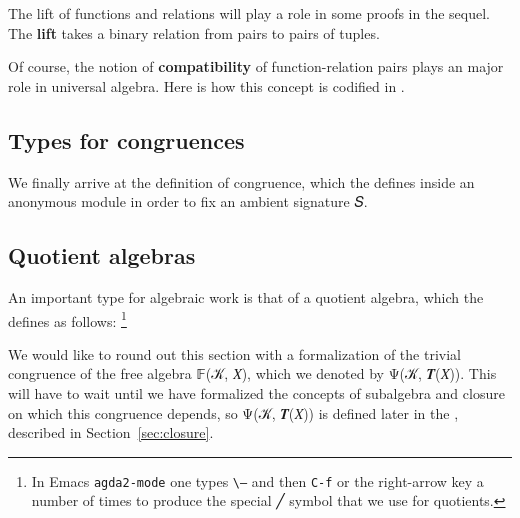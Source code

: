 \documentclass[a4paper,USenglish,cleveref,autoref,thm-restate]{lipics-v2019}
\begin{document}
The lift of functions and relations will play a role in some proofs in the sequel. The \textbf{lift} takes a binary relation from pairs to pairs of tuples.
\begin{code}\end{code}
Of course, the notion of \textbf{compatibility} of function-relation pairs plays an major role in universal algebra. Here is how this concept is codified in \agdaualib.
\begin{code}\end{code}

\subsection{Types for congruences}\label{sec:types-for-congruences}
We finally arrive at the definition of congruence, which the \agdaualib defines inside an anonymous module in order to fix an ambient signature \ab 𝑆.
\begin{code}\end{code}

\subsection{Quotient algebras}
An important type for algebraic work is that of a quotient algebra, which the \agdaualib defines as follows:%
\footnote{In Emacs \texttt{agda2-mode} one types \texttt{\textbackslash ---} and then \texttt{C-f} or the right-arrow key a number of times to produce the special ╱ symbol that we use for quotients.}
\begin{code}\end{code}


We would like to round out this section with a formalization of the trivial congruence of the free algebra 𝔽(𝒦, 𝑋), which we denoted by Ψ(𝒦, 𝑻(𝑋)). This will have to wait until we have formalized the concepts of subalgebra and closure on which this congruence depends, so Ψ(𝒦, 𝑻(𝑋)) is defined later in the \closuremodule, described in Section~\ref{sec:closure}.

\end{document}

